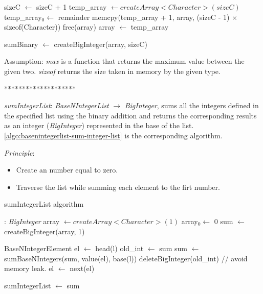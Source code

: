 \documentclass[book, nodocumentinfo]{upmethodology-document}
\newcommand{\separator}{\centerline{********************}}
\begin{document}
\begin{algorithm}[H]
\begin{algorithmic}
                \State sizeC \(\leftarrow\) sizeC + 1
                \State temp\_array \(\leftarrow createArray<Character>(sizeC)\)
                \State temp\_array\(_0 \leftarrow\) remainder
                \State memcpy(temp\_array + 1, array, (sizeC - 1) \(×\) sizeof(Character))
                \State free(array)
                \State array \(\leftarrow\) temp\_array
            \EndIf

            \State sumBinary \(\leftarrow\) createBigInteger(array, sizeC)
        \EndFunction
    \end{algorithmic}
\end{algorithm}

Assumption: \emph{max} is a function that returns the maximum value between the given two.
\emph{sizeof} returns the size taken in memory by the given type.

\separator

\emph{sumIntegerList}: \emph{BaseNIntegerList} \(\rightarrow\) \emph{BigInteger},
sums all the integers defined in the specified list using the binary addition and returns
the corresponding results as an integer (\emph{BigInteger}) represented in the base of the list.
\ref{algo:basenintegerlist-sum-integer-list} is the corresponding algorithm.

\emph{Principle}:
\begin{itemize}
    \item Create an number equal to zero.
    \item Traverse the list while summing each element to the firt number.
\end{itemize}

\begin{algorithm}[H]
    \caption{sumIntegerList algorithm}
    \label{algo:basenintegerlist-sum-integer-list}

    \begin{algorithmic}
         : \emph{BigInteger}
            \State array \(\leftarrow createArray<Character>(1)\)
            \State array\(_0 \leftarrow\) 0
            \State sum \(\leftarrow\) createBigInteger(array, 1)

            \State BaseNIntegerElement el \(\leftarrow\) head(l)
                \State old\_int \(\leftarrow\) sum
                \State sum \(\leftarrow\) sumBaseNIntegers(sum, value(el), base(l))
                \State deleteBigInteger(old\_int) // avoid memory leak.
                \State el \(\leftarrow\) next(el)
            \EndWhile

            \State sumIntegerList \(\leftarrow\) sum
        \EndFunction
    \end{algorithmic}
\end{algorithm}
\end{document}
